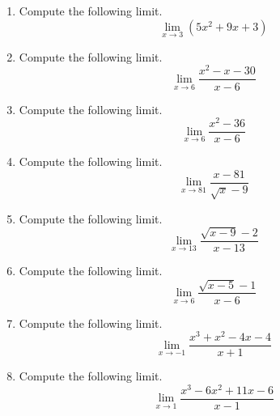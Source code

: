 \documentclass{article}
\begin{document}
\ActivityTitle[class=Calculus I, number=1, name=Limits]

\begin{enumerate}
\item Compute the following limit. \[ \lim_{x \rightarrow 3} \left( 5 x^2 + 9 x + 3 \right) \]



  
\vspace{5cm}

\item Compute the following limit. \[ \displaystyle\lim_{x \rightarrow 6} \frac{x^2 - x - 30}{x - 6} \]



  
\vspace{5cm}

\item Compute the following limit. \[ \lim_{x \rightarrow 6} \frac{x^2 - 36}{x - 6} \]



  
\vspace{5cm}

\item Compute the following limit. \[ \lim_{x \rightarrow 81} \frac{x - 81}{\sqrt{x} - 9} \]



  
\vspace{5cm}

\item Compute the following limit. \[ \lim_{x \rightarrow 13} \frac{\sqrt{x - 9} - 2}{x - 13} \]



  
\vspace{5cm}

\item Compute the following limit. \[ \lim_{x \rightarrow 6} \frac{\sqrt{x - 5} - 1}{x - 6} \]



  
\vspace{5cm}

\item Compute the following limit. \[ \lim_{x \rightarrow -1} \frac{x^3 + x^2 - 4x - 4}{x + 1} \]



  
\vspace{5cm}

\item Compute the following limit. \[ \lim_{x \rightarrow 1} \frac{x^3 - 6x^2 + 11x - 6}{x - 1} \]



  
\vspace{5cm}
\end{enumerate}
\end{document}
